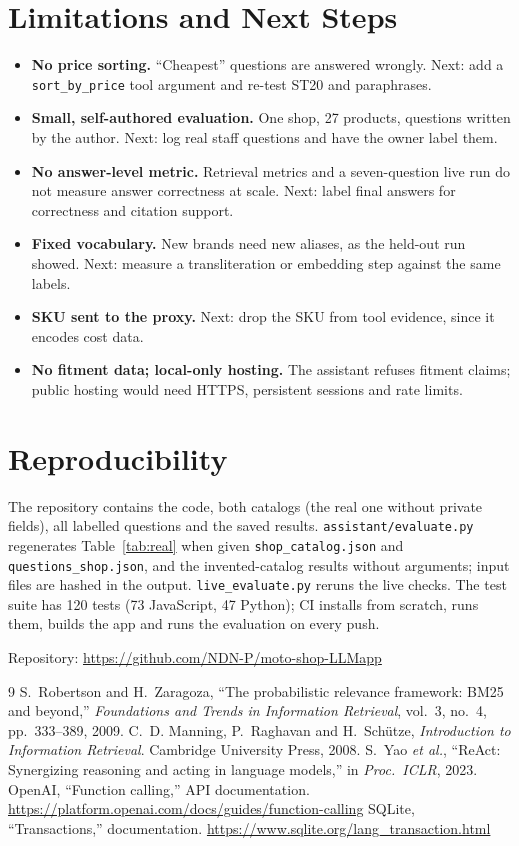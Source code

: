 \documentclass[10pt,twocolumn,a4paper]{article}
\newcommand{\code}[1]{\texttt{#1}}
\begin{document}
\section{Limitations and Next Steps}

\begin{itemize}
\item \textbf{No price sorting.} ``Cheapest'' questions are answered wrongly. Next: add a \code{sort\_by\_price} tool argument and re-test ST20 and paraphrases.
\item \textbf{Small, self-authored evaluation.} One shop, 27 products, questions written by the author. Next: log real staff questions and have the owner label them.
\item \textbf{No answer-level metric.} Retrieval metrics and a seven-question live run do not measure answer correctness at scale. Next: label final answers for correctness and citation support.
\item \textbf{Fixed vocabulary.} New brands need new aliases, as the held-out run showed. Next: measure a transliteration or embedding step against the same labels.
\item \textbf{SKU sent to the proxy.} Next: drop the SKU from tool evidence, since it encodes cost data.
\item \textbf{No fitment data; local-only hosting.} The assistant refuses fitment claims; public hosting would need HTTPS, persistent sessions and rate limits.
\end{itemize}

\section{Reproducibility}

The repository contains the code, both catalogs (the real one without private fields), all labelled questions and the saved results. \code{assistant/evaluate.py} regenerates Table~\ref{tab:real} when given \code{shop\_catalog.json} and \code{questions\_shop.json}, and the invented-catalog results without arguments; input files are hashed in the output. \code{live\_evaluate.py} reruns the live checks. The test suite has 120 tests (73 JavaScript, 47 Python); CI installs from scratch, runs them, builds the app and runs the evaluation on every push.

\noindent Repository: \url{https://github.com/NDN-P/moto-shop-LLMapp}

\begin{thebibliography}{9}\small
{} S.~Robertson and H.~Zaragoza, ``The probabilistic relevance framework: BM25 and beyond,'' \emph{Foundations and Trends in Information Retrieval}, vol.~3, no.~4, pp.~333--389, 2009.
 C.~D. Manning, P.~Raghavan and H.~Sch\"utze, \emph{Introduction to Information Retrieval}. Cambridge University Press, 2008.
 S.~Yao \emph{et al.}, ``ReAct: Synergizing reasoning and acting in language models,'' in \emph{Proc.\ ICLR}, 2023.
 OpenAI, ``Function calling,'' API documentation. \url{https://platform.openai.com/docs/guides/function-calling}
 SQLite, ``Transactions,'' documentation. \url{https://www.sqlite.org/lang_transaction.html}
\end{thebibliography}
\end{document}
